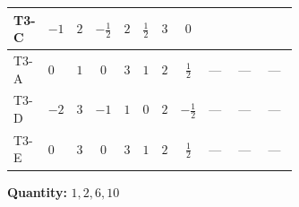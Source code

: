 \documentclass[8pt]{article}
\begin{document}
\begin{landscape}
\begin{longtable}{@{}llcccccc >{\raggedright\arraybackslash}p{0.21\linewidth} >{\raggedright\arraybackslash}p{0.21\linewidth} >{\raggedright\arraybackslash}p{0.21\linewidth}@{}}
T3-C & $-1$ & $2$ & $-\frac{1}{2}$ & $2$ & $\frac{1}{2}$ & $3$ & $0$ & \scriptsize\adjustbox{max width=\linewidth}{$\begin{gathered} - \frac{lambda12Inv2 \overline{y_{1}} \overline{y_{2}}}{6 MF}\end{gathered}$} & \scriptsize\adjustbox{max width=\linewidth}{$\begin{gathered} - \frac{\sqrt{3} g_{2}^{2} \overline{y_{1}} \overline{y_{2}}}{8 MF}\end{gathered}$} & \scriptsize\adjustbox{max width=\linewidth}{$\begin{gathered} \frac{\sqrt{3} ye \overline{y_{1}} \overline{y_{2}} \overline{ye}}{24 MF}\end{gathered}$} \\
\midrule
T3-A & $0$ & $1$ & $0$ & $3$ & $1$ & $2$ & $\frac{1}{2}$ & --- & --- & --- \\
\midrule
T3-D & $-2$ & $3$ & $-1$ & $1$ & $0$ & $2$ & $-\frac{1}{2}$ & --- & --- & --- \\
\midrule
T3-E & $0$ & $3$ & $0$ & $3$ & $1$ & $2$ & $\frac{1}{2}$ & --- & --- & --- \\
\midrule
\bottomrule
\end{longtable}
\clearpage
\noindent\textbf{Quantity: }$\mathrm{1,2,6,10}$\par\smallskip

\end{landscape}
\end{document}
